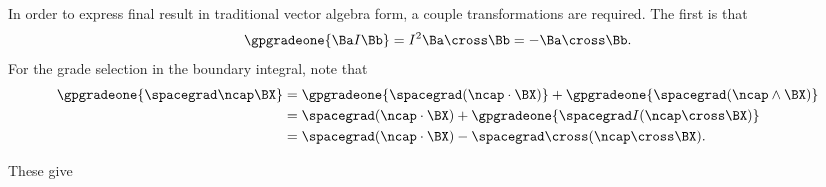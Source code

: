 In order to express final result in traditional vector algebra form, a couple transformations are required.  The first is that
%
\begin{equation}\label{eqn:helmholtzDerviationMultivector:800}
\gpgradeone{ \Ba I \Bb } = I^2 \Ba \cross \Bb = -\Ba \cross \Bb.
\end{equation}
%
For the grade selection in the boundary integral, note that
\begin{equation}\label{eqn:helmholtzDerviationMultivector:740}
\begin{aligned}
\gpgradeone{ \spacegrad \ncap \BX }
&=
\gpgradeone{ \spacegrad (\ncap \cdot \BX) }
+
\gpgradeone{ \spacegrad (\ncap \wedge \BX) } \\
&=
\spacegrad (\ncap \cdot \BX)
+
\gpgradeone{ \spacegrad I (\ncap \cross \BX) } \\
&=
\spacegrad (\ncap \cdot \BX)
-
\spacegrad \cross (\ncap \cross \BX).
\end{aligned}
\end{equation}

These give

